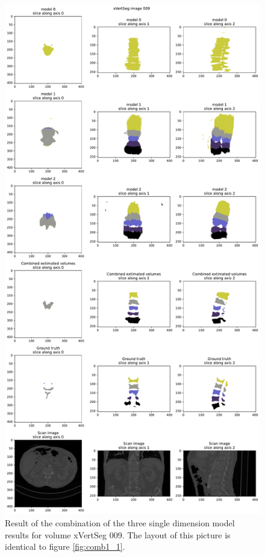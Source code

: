 \begin{figure}
    \centering
    \includegraphics[width=.95\textwidth]{images/comb1_denoise2_erode1_xVertSeg_009.pdf}
    \caption{
        Result of the combination of the three single dimension model results for volume xVertSeg 009. The layout of this picture is identical to figure \ref{fig:comb1_1}.
        \protect
        \label{fig:comb1_2}
    }
\end{figure}
